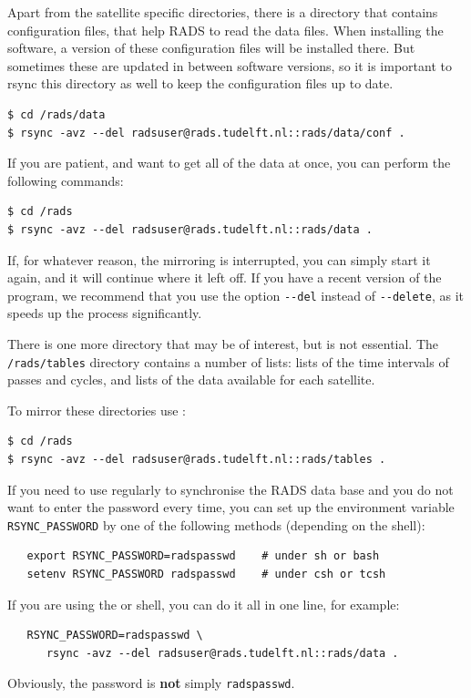 \documentclass[a4paper,11pt,openany,natbib,nomargin]{thesis}
\begin{document}


Apart from the satellite specific directories, there is a directory that contains configuration files, that help RADS to read the data files. When installing the software, a version of these configuration files will be installed there. But sometimes these are updated in between software versions, so it is important to rsync this directory as well to keep the configuration files up to date.
\begin{verbatim}
$ cd /rads/data
$ rsync -avz --del radsuser@rads.tudelft.nl::rads/data/conf .
\end{verbatim}

If you are patient, and want to get all of the data at once, you can perform the following commands:
\begin{verbatim}
$ cd /rads
$ rsync -avz --del radsuser@rads.tudelft.nl::rads/data .
\end{verbatim}

If, for whatever reason, the mirroring is interrupted, you can simply start it again, and it will continue where it left off. If you have a recent version of the  program, we recommend that you use the option \verb|--del| instead of \verb|--delete|, as it speeds up the process significantly.

There is one more directory that may be of interest, but is not essential. The \verb|/rads/tables| directory contains a number of lists: lists of the time intervals of passes and cycles, and lists of the data
available for each satellite.

To mirror these directories use :
\begin{verbatim}
$ cd /rads
$ rsync -avz --del radsuser@rads.tudelft.nl::rads/tables .
\end{verbatim}

If you need to use  regularly to synchronise the RADS data base and you do not want to enter the password every time, you can set up the environment variable \verb|RSYNC_PASSWORD| by one of the following methods (depending on the shell):
\begin{verbatim}
   export RSYNC_PASSWORD=radspasswd    # under sh or bash
   setenv RSYNC_PASSWORD radspasswd    # under csh or tcsh
\end{verbatim}
If you are using the  or  shell, you can do it all in one line, for example:
\begin{verbatim}
   RSYNC_PASSWORD=radspasswd \
      rsync -avz --del radsuser@rads.tudelft.nl::rads/data .
\end{verbatim}
Obviously, the password is \textbf{not} simply \texttt{radspasswd}.
\end{document}
